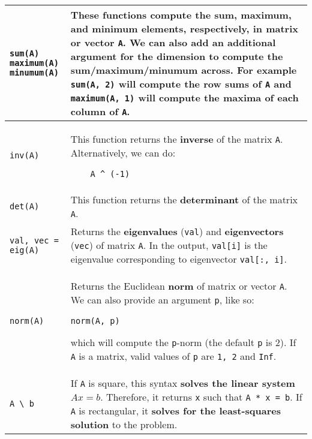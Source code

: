 \documentclass[]{article}
\begin{document}
\begin{longtable}{ |m{6cm}  | m{11cm} |}
\begin{verbatim}
sum(A)
maximum(A)
minumum(A)
	\end{verbatim}
	& These functions compute the \textbf{sum, maximum, and minimum} elements,
    respectively, in matrix or vector \texttt{A}. We can also add an
    additional argument for the dimension to compute the sum/maximum/minumum
    across. For example \texttt{sum(A, 2)} will compute the row sums of
    \texttt{A} and \texttt{maximum(A, 1)} will compute the maxima of each
    column of \texttt{A}.
    \\\hline
    \begin{verbatim}
inv(A)
	\end{verbatim}
	& This function returns the \textbf{inverse} of the matrix
    \texttt{A}. Alternatively, we can do:
    \begin{verbatim}
    A ^ (-1)
    \end{verbatim}
    \\\hline
 \begin{verbatim}
det(A)
	\end{verbatim}
	& This function returns the \textbf{determinant} of the matrix
    \texttt{A}.     
    \\\hline
 \begin{verbatim}
val, vec = eig(A)
	\end{verbatim} 
&    Returns the \textbf{eigenvalues} (\texttt{val}) and \textbf{eigenvectors} (\texttt{vec}) of
    matrix \texttt{A}. In the output, \texttt{val[i]} is the eigenvalue
    corresponding to eigenvector \texttt{val[:, i]}.
    \\\hline
 \begin{verbatim}
norm(A)
	\end{verbatim} 
&    Returns the Euclidean \textbf{norm} of matrix or vector \texttt{A}.
We can also provide an argument \texttt{p}, like so:
\begin{verbatim}
norm(A, p)
\end{verbatim}
which will compute the \texttt{p}-norm (the default \texttt{p} is 2). If
\texttt{A} is a matrix, valid values of \texttt{p} are \texttt{1, 2} and
\texttt{Inf}.
\\\hline
 \begin{verbatim}
A \ b
	\end{verbatim} 
&   If \texttt{A} is square, this syntax \textbf{solves the linear system} $Ax = b$.
Therefore, it returns \texttt{x} such that \texttt{A * x = b}.
If \texttt{A} is rectangular, it \textbf{solves for the least-squares
solution} to the
problem.
\\\hline
\end{longtable} 
\end{document}
